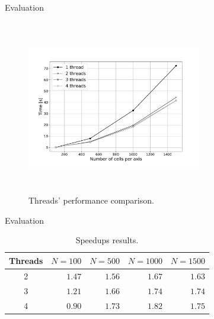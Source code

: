 \documentclass{beamer}
\begin{document}
      \begin{frame}{Evaluation}
        \begin{figure}[!ht]
          \centering
          \includegraphics[width=3in,height=3in,clip,keepaspectratio]{figures/benchmark.pdf}
          \caption{Threads' performance comparison.}
          \label{fig:benchmark}
        \end{figure}
      \end{frame}
      
      \begin{frame}{Evaluation}
        \begin{table}[!ht]
        \renewcommand{\arraystretch}{1.3}
        \centering
        \caption{Speedups results.}
        \label{tab:speedups}
        \begin{tabular}{c||rrrr}
          \hline
          Threads & $N=100$ & $N=500$ & $N=1000$ & $N=1500$ \\ \hline\hline
          2       & $1.47$ & $1.56$ & $1.67$ & $1.63$ \\
          3       & $1.21$ & $1.66$ & $1.74$ & $1.74$ \\
          4       & $0.90$ & $1.73$ & $1.82$ & $1.75$  
          \end{tabular}
        \end{table}
      \end{frame}
      
\end{document}
